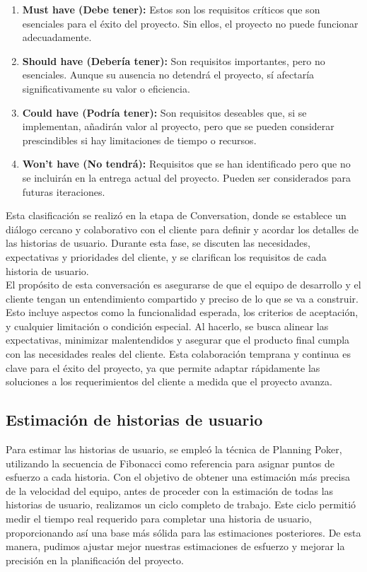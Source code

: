 \begin{enumerate}
    \item \textbf{Must have (Debe tener):} Estos son los requisitos críticos que son esenciales para el éxito del proyecto. Sin ellos, el proyecto no puede funcionar adecuadamente.
    \item \textbf{Should have (Debería tener):} Son requisitos importantes, pero no esenciales. Aunque su ausencia no detendrá el proyecto, sí afectaría significativamente su valor o eficiencia.
    \item \textbf{Could have (Podría tener):} Son requisitos deseables que, si se implementan, añadirán valor al proyecto, pero que se pueden considerar prescindibles si hay limitaciones de tiempo o recursos.
    \item \textbf{Won't have (No tendrá):} Requisitos que se han identificado pero que no se incluirán en la entrega actual del proyecto. Pueden ser considerados para futuras iteraciones.
\end{enumerate}

Esta clasificación se realizó en la etapa de Conversation, donde se establece un diálogo cercano y colaborativo con el cliente para definir y acordar los detalles de las historias de usuario. 
Durante esta fase, se discuten las necesidades, expectativas y prioridades del cliente, y se clarifican los requisitos de cada historia de usuario.\\
El propósito de esta conversación es asegurarse de que el equipo de desarrollo y el cliente tengan un entendimiento compartido y preciso de lo que se va a construir. Esto incluye aspectos como la 
funcionalidad esperada, los criterios de aceptación, y cualquier limitación o condición especial. Al hacerlo, se busca alinear las expectativas, minimizar malentendidos y asegurar que el producto final 
cumpla con las necesidades reales del cliente. Esta colaboración temprana y continua es clave para el éxito del proyecto, ya que permite adaptar rápidamente las soluciones a los requerimientos del cliente 
a medida que el proyecto avanza.


\subsection{Estimación de historias de usuario}

Para estimar las historias de usuario, se empleó la técnica de Planning Poker, utilizando la secuencia de Fibonacci como referencia para asignar puntos de esfuerzo a cada historia. 
Con el objetivo de obtener una estimación más precisa de la velocidad del equipo, antes de proceder con la estimación de todas las historias de usuario, realizamos un ciclo completo de trabajo. 
Este ciclo permitió medir el tiempo real requerido para completar una historia de usuario, proporcionando así una base más sólida para las estimaciones posteriores. De esta manera, pudimos ajustar mejor 
nuestras estimaciones de esfuerzo y mejorar la precisión en la planificación del proyecto.

